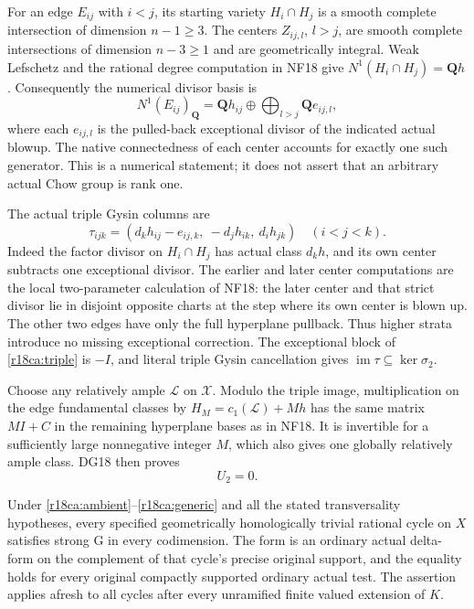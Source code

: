For an edge $E_{ij}$ with $i<j$, its starting variety
$H_i\cap H_j$ is a smooth complete intersection of dimension
$n-1\ge3$.  The centers $Z_{ij,l}$, $l>j$, are smooth
complete intersections of dimension $n-3\ge1$ and are
geometrically integral.  Weak Lefschetz and the rational
degree computation in NF18 give $N^1(H_i\cap H_j)=\mathbf Qh$.
Consequently the numerical divisor basis is
\[
 N^1(E_{ij})_{\mathbf Q}
    =\mathbf Qh_{ij}\oplus\bigoplus_{l>j}\mathbf Q e_{ij,l},
 \tag{CA18.5}\label{r18ca:edge-divisors}
\]
where each $e_{ij,l}$ is the pulled-back exceptional divisor
of the indicated actual blowup.  The native connectedness
of each center accounts for exactly one such generator.
This is a numerical statement; it does not assert that an
arbitrary actual Chow group is rank one.

The actual triple Gysin columns are
\[
 \tau_{ijk}
   =(d_kh_{ij}-e_{ij,k},\ -d_jh_{ik},\ d_ih_{jk})
       \quad(i<j<k).
 \tag{CA18.6}\label{r18ca:triple}
\]
Indeed the factor divisor on $H_i\cap H_j$ has actual class
$d_kh$, and its own center subtracts one exceptional divisor.
The earlier and later center computations are the local
two-parameter calculation of NF18: the later center and
that strict divisor lie in disjoint opposite charts at the
step where its own center is blown up.  The other two edges
have only the full hyperplane pullback.  Thus higher strata
introduce no missing exceptional correction.
The exceptional block of \eqref{r18ca:triple} is $-I$,
and literal triple Gysin cancellation gives
$\operatorname{im}\tau\subseteq\ker\sigma_2$.

Choose any relatively ample $\mathcal L$ on $\mathcal X$.
Modulo the triple image, multiplication on the edge
fundamental classes by
$H_M=c_1(\mathcal L)+Mh$ has the same matrix $MI+C$
in the remaining hyperplane bases as in NF18.
It is invertible for a sufficiently large nonnegative
integer $M$, which also gives one globally relatively
ample class.  DG18 then proves
\[
                              U_2=0.
 \tag{CA18.7}\label{r18ca:U2}
\]

\begin{theorem}
\label{r18ca:full-G}
Under \eqref{r18ca:ambient}--\eqref{r18ca:generic} and all
the stated transversality hypotheses, every specified
geometrically homologically trivial rational cycle on $X$
satisfies strong G in every codimension.
The form is an ordinary actual delta-form on the complement
of that cycle's precise original support, and the equality
holds for every original compactly supported ordinary actual
test.  The assertion applies afresh to all cycles after
every unramified finite valued extension of $K$.
\end{theorem}

